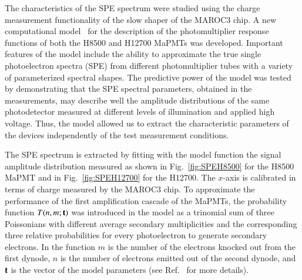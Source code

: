 \documentclass[5p,times,twocolumn]{elsarticle}
\begin{document}
The characteristics of the SPE spectrum were studied using the charge measurement functionality of the slow shaper
of the MAROC3 chip. A new computational model~\cite{Pavel} for the description of the photomultiplier response
functions of both the H8500 and H12700 MaPMTs was developed. Important features of the model include the ability
to approximate the true single photoelectron spectra (SPE) from different photomultiplier tubes with a variety of
parameterized spectral shapes.
The predictive power of the model was tested by demonstrating that the SPE spectral parameters, obtained in the
measurements, may describe well the amplitude distributions of the same photodetector measured at different levels
of illumination and applied high voltage. Thus, the model allowed us to extract the characteristic parameters of the devices independently of the test measurement conditions.

The SPE spectrum is extracted by fitting with the model function the signal amplitude distribution measured 
as shown in Fig.~\ref{fig:SPEH8500} for the H8500 MaPMT and in Fig.~\ref{fig:SPEH12700} for the H12700.
The $x$-axis is calibrated in terms of charge measured by the MAROC3 chip.
To approximate the performance of the first amplification cascade of the MaPMTs, the probability function
$T(n,m;{\bf t})$ was introduced in the model as a trinomial sum of three Poissonians with different average secondary
multiplicities and the corresponding three relative probabilities for every photoelectron to generate secondary
electrons. In the function $m$ is the number of the electrons knocked out from the first dynode, $n$ is the number
of electrons emitted out of the second dynode, and ${\bf t}$ is the vector of the model parameters
(see Ref.~\cite{Pavel} for more details).
\end{document}
